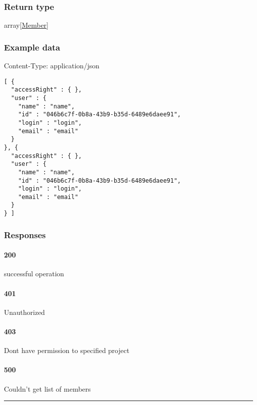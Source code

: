\hypertarget{return-type-6}{%
\subsubsection*{Return type}\label{return-type-6}}

array{[}\protect\hyperlink{Member}{Member}{]}

\hypertarget{example-data-6}{%
\subsubsection*{Example data}\label{example-data-6}}

Content-Type: application/json

\begin{verbatim}
[ {
  "accessRight" : { },
  "user" : {
    "name" : "name",
    "id" : "046b6c7f-0b8a-43b9-b35d-6489e6daee91",
    "login" : "login",
    "email" : "email"
  }
}, {
  "accessRight" : { },
  "user" : {
    "name" : "name",
    "id" : "046b6c7f-0b8a-43b9-b35d-6489e6daee91",
    "login" : "login",
    "email" : "email"
  }
} ]
\end{verbatim}

\hypertarget{responses-6}{%
\subsubsection*{Responses}\label{responses-6}}

\hypertarget{section-20}{%
\paragraph{200}\label{section-20}}

successful operation

\hypertarget{section-21}{%
\paragraph{401}\label{section-21}}

Unauthorized \protect\hyperlink{}{}

\hypertarget{section-22}{%
\paragraph{403}\label{section-22}}

Dont have permission to specified project \protect\hyperlink{}{}

\hypertarget{section-23}{%
\paragraph{500}\label{section-23}}

Couldn't get list of members \protect\hyperlink{}{}

\begin{center}\rule{0.5\linewidth}{0.5pt}\end{center}
